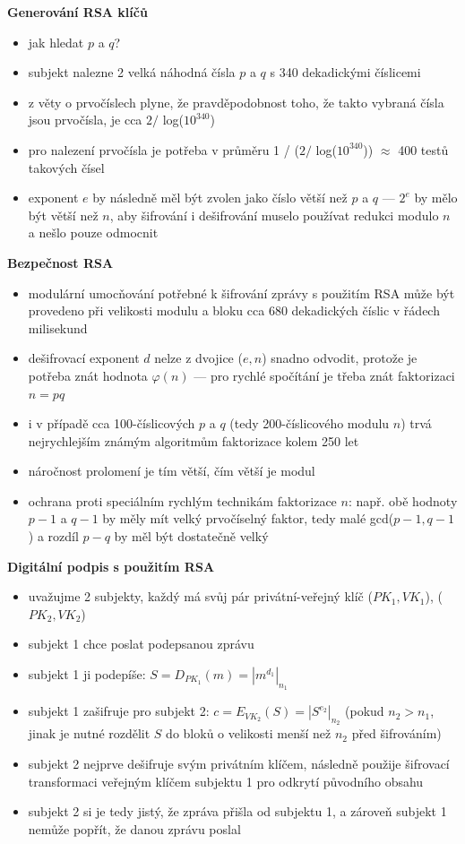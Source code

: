 \textbf{Generování RSA klíčů}
\begin{itemize}
	\item jak hledat $p$ a $q$?
	\item subjekt nalezne 2 velká náhodná čísla $p$ a $q$ s 340 dekadickými číslicemi
	\item z věty o prvočíslech plyne, že pravděpodobnost toho, že takto vybraná čísla jsou prvočísla, je cca $2 /$ log($10^340$)
	\item pro nalezení prvočísla je potřeba v průměru 1 / ($2 /$ log($10^340$)) $\approx$ 400 testů takových čísel
	\item exponent $e$ by následně měl být zvolen jako číslo větší než $p$ a $q$ --- $2^e$ by mělo být větší než $n$, aby šifrování i dešifrování muselo používat redukci modulo $n$ a nešlo pouze odmocnit
\end{itemize}

\textbf{Bezpečnost RSA}
\begin{itemize}
	\item modulární umocňování potřebné k šifrování zprávy s použitím RSA může být provedeno při velikosti modulu a bloku cca 680 dekadických číslic v řádech milisekund
	\item dešifrovací exponent $d$ nelze z dvojice ($e, n$) snadno odvodit, protože je potřeba znát hodnota $\varphi(n)$ --- pro rychlé spočítání je třeba znát faktorizaci $n = pq$
	\item i v případě cca 100-číslicových $p$ a $q$ (tedy 200-číslicového modulu $n$) trvá nejrychlejším známým algoritmům faktorizace kolem 250 let
	\item náročnost prolomení je tím větší, čím větší je modul 
	\item ochrana proti speciálním rychlým technikám faktorizace $n$: např. obě hodnoty $p-1$ a $q-1$ by měly mít velký prvočíselný faktor, tedy malé gcd($p-1, q-1$) a rozdíl $p - q$ by měl být dostatečně velký
\end{itemize}

\textbf{Digitální podpis s použitím RSA}
\begin{itemize}
	\item uvažujme 2 subjekty, každý má svůj pár privátní-veřejný klíč ($PK_1, VK_1$), ($PK_2, VK_2$)
	\item subjekt 1 chce poslat podepsanou zprávu
	\item subjekt 1 ji podepíše: $S = D_{PK_1}(m) = |m^{d_1}|_{n_1}$
	\item subjekt 1 zašifruje pro subjekt 2: $c = E_{VK_2}(S) = |S^{e_2}|_{n_2}$ (pokud $n_2 > n_1$, jinak je nutné rozdělit $S$ do bloků o velikosti menší než $n_2$ před šifrováním)
	\item subjekt 2 nejprve dešifruje svým privátním klíčem, následně použije šifrovací transformaci veřejným klíčem subjektu 1 pro odkrytí původního obsahu
	\item subjekt 2 si je tedy jistý, že zpráva přišla od subjektu 1, a zároveň subjekt 1 nemůže popřít, že danou zprávu poslal
\end{itemize}

